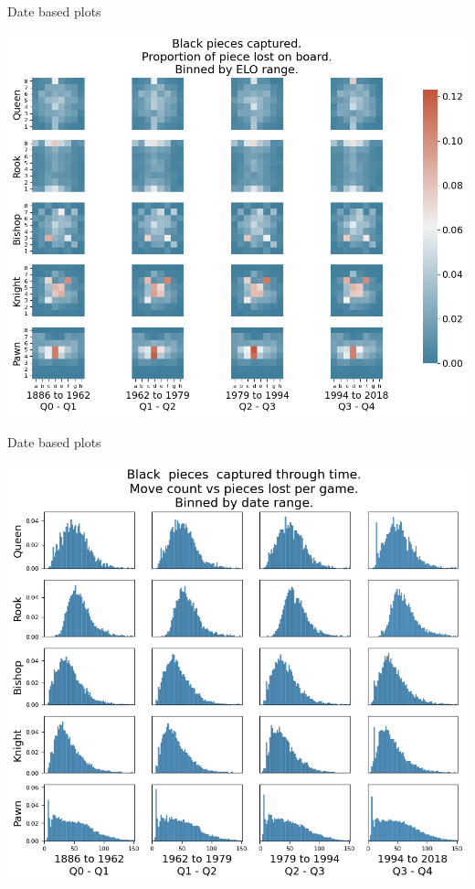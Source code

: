 \documentclass[presentation, 8pt]{beamer}
\begin{document}
\begin{frame}[label={sec:org24ac06d}]{Date based plots}
\begin{center}
\includegraphics[width=.9\linewidth]{Images/_HEATMAP_Queen_Rook_Bishop_Knight_Pawn_BLACK_DATE_TOURNEMENTS.png}
\end{center}
\end{frame}
\begin{frame}[label={sec:orgd367c01}]{Date based plots}
\begin{center}
\includegraphics[width=.9\linewidth]{Images/_HIST_Queen_Rook_Bishop_Knight_Pawn_BLACK_DATE_TOURNEMENTS.png}
\end{center}
\end{frame}
\end{document}
